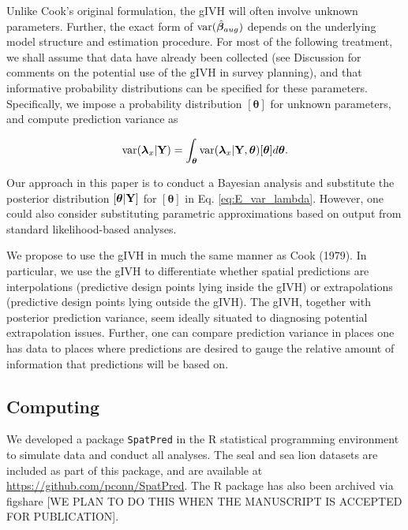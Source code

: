 \documentclass[12pt,english]{article}
\begin{document}
\begin{spacing}{1.9}
Unlike Cook's original formulation, the gIVH will often involve unknown parameters.  Further, the exact form of ${\rm var}(\hat{\boldsymbol{\beta}}_{aug})$ depends on the underlying model structure and estimation procedure.  For most of the following treatment, we shall assume that data have already been collected (see Discussion for comments on the potential use of the gIVH in survey planning), and that informative probability distributions can be specified for these parameters.  Specifically, we impose a probability distribution $[\boldsymbol{\theta}]$ for unknown parameters, and compute prediction variance as
\begin{linenomath*}
\begin{equation}
  \label{eq:E_var_lambda}
  {\rm var}(\boldsymbol{\lambda}_x | {\bf Y}) = \int_{\boldsymbol{\theta}} {\rm var}(\boldsymbol{\lambda}_x | {\bf Y}, \boldsymbol{\theta}) [\boldsymbol{\theta}] d \boldsymbol{\theta}.
\end{equation}
\end{linenomath*}
Our approach in this paper is to conduct a Bayesian analysis and substitute the posterior distribution $[\boldsymbol{\theta}|{\bf Y}]$ for $[\boldsymbol{\theta}]$ in Eq. \ref{eq:E_var_lambda}.  However, one could also consider substituting parametric approximations based on output from standard likelihood-based analyses.

We propose to use the gIVH in much the same manner as Cook (1979).  In particular, we use the gIVH to differentiate whether spatial predictions are interpolations (predictive design points lying inside the gIVH) or extrapolations (predictive design points lying outside the gIVH).  The gIVH, together with posterior prediction variance, seem ideally situated to diagnosing potential extrapolation issues. Further, one can compare prediction variance in places one has data to places where predictions are desired to gauge the relative amount of information that predictions will be based on.

\subsection{Computing}

We developed a package \texttt{SpatPred} in the R statistical programming environment \citep{RTeam2012} to simulate data and conduct all analyses.  The seal and sea lion datasets are included as part of this package, and are available at \url{https://github.com/pconn/SpatPred}.  The R package has also been archived via figshare [WE PLAN TO DO THIS WHEN THE MANUSCRIPT IS ACCEPTED FOR PUBLICATION].



\end{spacing}
\end{document}
